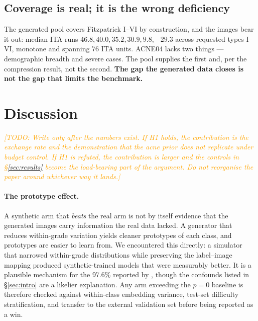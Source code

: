 \documentclass[11pt]{article}
\newcommand{\TODO}[1]{\textcolor{orange}{\textit{[TODO: #1]}}}
\begin{document}
\subsection{Coverage is real; it is the wrong deficiency}

The generated pool covers Fitzpatrick I--VI by construction, and the images bear it out:
median ITA runs $46.8, 40.0, 35.2, 30.9, 9.8, -29.3$ across requested types I--VI,
monotone and spanning 76 ITA units. ACNE04 lacks two things --- demographic breadth and
severe cases. The pool supplies the first and, per the compression result, not the second.
\textbf{The gap the generated data closes is not the gap that limits the benchmark.}

\section{Discussion}
\label{sec:discussion}
\TODO{Write only after the numbers exist. If H1 holds, the contribution is the
exchange rate and the demonstration that the acne prior does not replicate under
budget control. If H1 is refuted, the contribution is larger and the controls in
\S\ref{sec:results} become the load-bearing part of the argument. Do not reorganise
the paper around whichever way it lands.}

\paragraph{The prototype effect.} A synthetic arm that \emph{beats} the real arm is
not by itself evidence that the generated images carry information the real data
lacked. A generator that reduces within-grade variation yields cleaner prototypes of
each class, and prototypes are easier to learn from. We encountered this directly:
a simulator that narrowed within-grade distributions while preserving the
label--image mapping produced synthetic-trained models that were measurably better.
It is a plausible mechanism for the 97.6\% reported by \citet{zein2024}, though the
confounds listed in \S\ref{sec:intro} are a likelier explanation. Any arm
exceeding the $p=0$ baseline is therefore checked against within-class embedding
variance, test-set difficulty stratification, and transfer to the external validation
set before being reported as a win.
\end{document}
